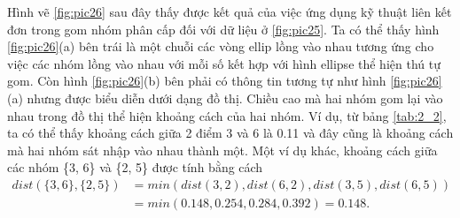 Hình vẽ \ref{fig:pic26} sau đây thấy được kết quả của việc ứng dụng kỹ thuật liên kết đơn trong gom nhóm phân cấp đối với dữ liệu ở \ref{fig:pic25}.
Ta có thể thấy hình \ref{fig:pic26}(a) bên trái là một chuỗi các vòng ellip lồng vào nhau tương ứng cho việc các nhóm lồng vào nhau với mỗi số kết hợp với hình ellipse thể hiện thú tự gom.
Còn hình \ref{fig:pic26}(b) bên phải có thông tin tương tự như hình \ref{fig:pic26}(a) nhưng được biểu diễn dưới dạng đồ thị.
Chiều cao mà hai nhóm gom lại vào nhau trong đồ thị thể hiện khoảng cách của hai nhóm.
Ví dụ, từ bảng \ref{tab:2_2}, ta có thể thấy khoảng cách giữa 2 điểm 3 và 6 là 0.11 và đây cũng là khoảng cách mà hai nhóm sát nhập vào nhau thành một. 
Một ví dụ khác, khoảng cách giữa các nhóm \{3, 6\} và \{2, 5\} được tính  bằng cách
\begin{equation}
\begin{aligned}
dist(\{3, 6\}, \{2, 5\})
&= min(dist(3,2),dist(6, 2), dist(3, 5), dist(6, 5)) \\
&= min (0.148, 0.254, 0.284, 0.392) = 0.148. \\
\end{aligned}
\end{equation}


